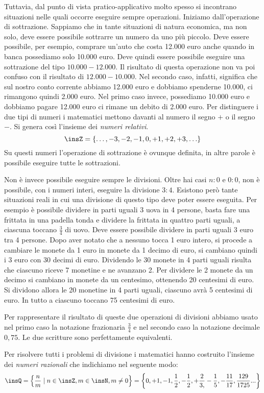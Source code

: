 Tuttavia, dal punto di vista pratico-applicativo molto spesso si incontrano situazioni nelle quali occorre eseguire sempre operazioni. Iniziamo dall'operazione di sottrazione. Sappiamo che in tante situazioni di natura economica, ma non solo, deve essere possibile sottrarre un numero da uno più piccolo. Deve essere possibile, per esempio, comprare un'auto che costa 12.000 euro anche quando in banca possediamo solo 10.000 euro. Deve quindi essere possibile eseguire una sottrazione del tipo $10.000-12.000$. Il risultato di questa operazione non va poi confuso con il risultato di $12.000-10.000$. Nel secondo caso, infatti, significa che sul nostro conto corrente abbiamo 12.000 euro e dobbiamo spenderne 10.000, ci rimangono quindi 2.000 euro. Nel primo caso invece, possediamo 10.000 euro e dobbiamo pagare
12.000 euro ci rimane un debito di 2.000 euro. Per distinguere i due tipi di numeri i matematici mettono davanti al numero il segno $+$ o il segno $-$. Si genera così l'insieme dei \emph{numeri relativi}.
\[\insZ=\{\ldots,-3,-2,-1,0,+1,+2,+3,\ldots\}\]
Su questi numeri l'operazione di sottrazione è ovunque definita, in altre parole è possibile eseguire tutte le sottrazioni.

Non è invece possibile eseguire sempre le divisioni. Oltre hai casi $n:0$ e $0:0$, non è possibile, con i numeri interi, eseguire la divisione $3:4$. Esistono però tante situazioni reali in cui una divisione di questo tipo deve poter essere eseguita. Per esempio è possibile dividere in parti uguali 3 uova in 4 persone, basta fare una frittata in una padella tonda e dividere la frittata in quattro parti uguali, a ciascuna toccano $\frac{3}{4}$ di uovo. Deve
essere possibile dividere in parti uguali 3 euro tra 4 persone. Dopo aver notato che a nessuno tocca 1 euro intero, si procede a cambiare le monete da 1 euro in monete da 1 decimo di euro, si cambiano quindi i 3 euro con 30 decimi di euro. Dividendo le 30 monete in 4 parti uguali risulta che ciascuno riceve 7 monetine e ne avanzano 2. Per dividere le 2 monete da un decimo si cambiano in monete da un centesimo, ottenendo 20 centesimi di euro. Si dividono allora le 20 monetine in 4 parti uguali, ciascuno avrà 5 centesimi di euro. In tutto a ciascuno toccano 75 centesimi di euro.

Per rappresentare il risultato di queste due operazioni di divisioni abbiamo usato nel primo caso la notazione frazionaria $\frac{3}{4}$ e nel secondo caso la notazione decimale $0,75$. Le due scritture sono perfettamente equivalenti.

Per risolvere tutti i problemi di divisione i matematici hanno costruito l'insieme dei \emph{ numeri razionali} che indichiamo nel seguente modo:
\[
\insQ=\left\{\frac{n}{m} \mid n\in \insZ,m\in \insN,m\neq
0\right\}=\left\{0,+1,-1,\frac{1}{2},-\frac{1}{2},+\frac{2}{3,}-\frac{1}{5},-\frac{11}{17},\frac{129}{1725}...\right\}
\]

